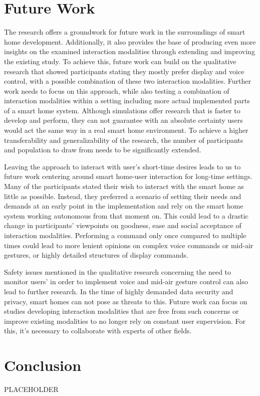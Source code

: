 \documentclass[sigchi]{acmart}
\begin{document}
	\section{Future Work}
	The research offers a groundwork for future work in the surroundings of smart home development. Additionally, it also provides the base of producing even more insights on the examined interaction modalities through extending and improving the existing study. To achieve this, future work can build on the qualitative research that showed participants stating they mostly prefer display and voice control, with a possible combination of these two interaction modalities. Further work needs to focus on this approach, while also testing a combination of interaction modalities within a setting including more actual implemented parts of a smart home system. Although simulations offer research that is faster to develop and perform, they can not guarantee with an absolute certainty users would act the same way in a real smart home environment. To achieve a higher transferability and generalizability of the research, the number of participants and population to draw from needs to be significantly extended. 
	
	Leaving the approach to interact with user's short-time desires leads to us to future work centering around smart home-user interaction for long-time settings. Many of the participants stated their wish to interact with the smart home as little as possible. Instead, they preferred a scenario of setting their needs and demands at an early point in the implementation and rely on the smart home system working autonomous from that moment on. This could lead to a drastic change in participants' viewpoints on goodness, ease and social acceptance of interaction modalities. Performing a command only once compared to multiple times could lead to more lenient opinions on complex voice commands or mid-air gestures, or highly detailed structures of display commands.
	
	Safety issues mentioned in the qualitative research concerning the need to monitor users' in order to implement voice and mid-air gesture control can also lead to further research. In the time of highly demanded data security and privacy, smart homes can not pose as threats to this. Future work can focus on studies developing interaction modalities that are free from such concerns or improve existing modalities to no longer rely on constant user supervision. For this, it's necessary to collaborate with experts of other fields.
	
	\section{Conclusion}
	PLACEHOLDER
	
	
	
	
	
\end{document}
